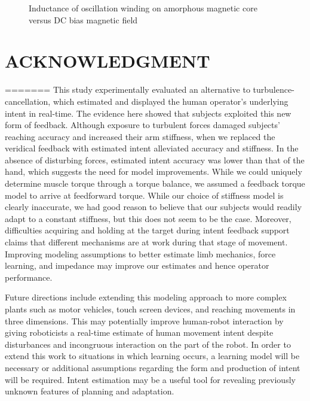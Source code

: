 \documentclass[letterpaper, 10 pt, conference]{ieeeconf}  %
\begin{document}
   \begin{figure}[thpb]
      \centering
      \caption{Inductance of oscillation winding on amorphous
       magnetic core versus DC bias magnetic field}
      \label{figurelabel}
   \end{figure}

\section*{ACKNOWLEDGMENT}
=======
This study experimentally evaluated an alternative to turbulence-cancellation, which estimated and displayed the human operator's underlying intent in real-time. The evidence here showed that subjects exploited this new form of feedback. Although exposure to turbulent forces damaged subjects' reaching accuracy and increased their arm stiffness, when we replaced the veridical feedback with estimated intent alleviated accuracy and stiffness. In the absence of disturbing forces, estimated intent accuracy was lower than that of the hand, which suggests the need for model improvements. While we could uniquely determine muscle torque through a torque balance, we assumed a feedback torque model to arrive at feedforward torque. While our choice of stiffness model is clearly inaccurate, we had good reason to believe that our subjects would readily adapt to a constant stiffness, but this does not seem to be the case. Moreover, difficulties acquiring and holding at the target during intent feedback support claims that different mechanisms are at work during that stage of movement\cite{niu2010temporal}. Improving modeling assumptions to better estimate limb mechanics, force learning, and impedance may improve our estimates and hence operator performance.

Future directions include extending this modeling approach to more complex plants such as motor vehicles, touch screen devices, and reaching movements in three dimensions. This may potentially improve human-robot interaction by giving roboticists a real-time estimate of human movement intent despite disturbances and incongruous interaction on the part of the robot. In order to extend this work to situations in which learning occurs, a learning model will be necessary or additional assumptions regarding the form and production of intent will be required. Intent estimation may be a useful tool for revealing previously unknown features of planning and adaptation.
\end{document}

